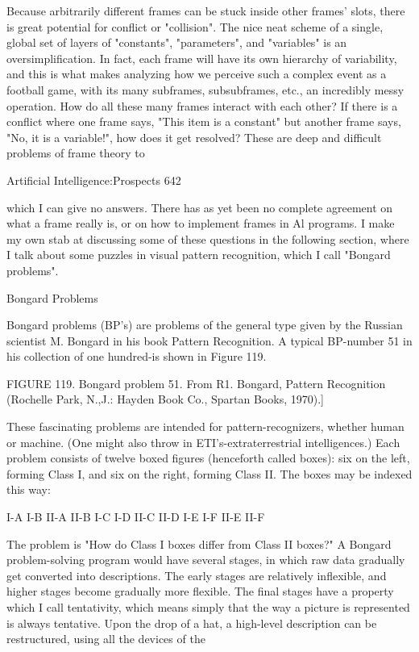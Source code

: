          Because arbitrarily different frames can be stuck inside other frames' slots, there
is great potential for conflict or "collision". The nice neat scheme of a single, global set of
layers of "constants", "parameters", and "variables" is an oversimplification. In fact, each
frame will have its own hierarchy of variability, and this is what makes analyzing how we
perceive such a complex event as a football game, with its many subframes,
subsubframes, etc., an incredibly messy operation. How do all these many frames interact
with each other? If there is a conflict where one frame says, "This item is a constant" but
another frame says, "No, it is a variable!", how does it get resolved? These are deep and
difficult problems of frame theory to




Artificial Intelligence:Prospects                                                          642

which I can give no answers. There has as yet been no complete agreement on what a
frame really is, or on how to implement frames in Al programs. I make my own stab at
discussing some of these questions in the following section, where I talk about some
puzzles in visual pattern recognition, which I call "Bongard problems".

                                    Bongard Problems

Bongard problems (BP's) are problems of the general type given by the Russian scientist
M. Bongard in his book Pattern Recognition. A typical BP-number 51 in his collection of
one hundred-is shown in Figure 119.




FIGURE 119. Bongard problem 51. From R1. Bongard, Pattern Recognition (Rochelle
Park, N.,J.: Hayden Book Co., Spartan Books, 1970).]

These fascinating problems are intended for pattern-recognizers, whether human or
machine. (One might also throw in ETI's-extraterrestrial intelligences.) Each problem
consists of twelve boxed figures (henceforth called boxes): six on the left, forming Class
I, and six on the right, forming Class II. The boxes may be indexed this way:

                       I-A    I-B            II-A    II-B
                       I-C    I-D            II-C    II-D
                       I-E    I-F            II-E    II-F

The problem is "How do Class I boxes differ from Class II boxes?"
        A Bongard problem-solving program would have several stages, in which raw
data gradually get converted into descriptions. The early stages are relatively inflexible,
and higher stages become gradually more flexible. The final stages have a property which
I call tentativity, which means simply that the way a picture is represented is always
tentative. Upon the drop of a hat, a high-level description can be restructured, using all
the devices of the




